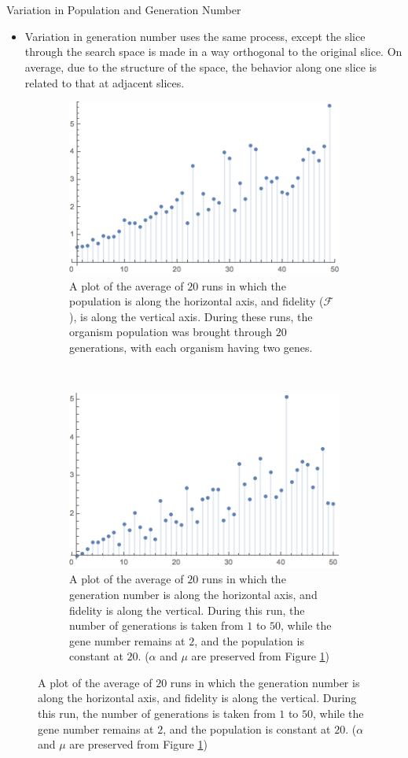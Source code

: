 \documentclass[12pt]{beamer}
\renewcommand{\maketitle}{%
	\begin{center}%
		\Huge\inserttitle\\[5mm]%
		\Large\insertauthor\\[5mm]%
		\Large\insertinstitute%
	\end{center}%
	\vspace*{-1.5ex}%
}
\begin{document}
\begin{frame}{\maketitle}
\begin{columns}
\begin{column}{.45\textwidth}
\begin{exampleblock}{Variation in Population and Generation Number}
\begin{itemize}
	\item Variation in generation number uses the same process, except the slice through the search space is made in a way orthogonal to the original slice. On average, due to the structure of the space, the behavior along one slice is related to that at adjacent slices. 
	\end{itemize}
	\vspace{-1.35em}
\begin{figure}[t!]
    \centering
    \begin{subfigure}[t]{0.5\textwidth}
        \centering
        \includegraphics[scale=1.2]{20G_Plot_2.png}
        \caption{A plot of the average of $20$ runs in which the population is along the horizontal axis, and fidelity ($\mathcal{F}$), is along the vertical axis. During these runs, the organism population was brought through $20$ generations, with each organism having two genes.}
        \label{fig:pop_plot}
    \end{subfigure}%
    ~
    \begin{subfigure}[t]{0.5\textwidth}
        \centering
        \includegraphics[scale=1.2]{20O_Plot_2.png}
        \caption{A plot of the average of $20$ runs in which the generation number is along the horizontal axis, and fidelity is along the vertical. During this run, the number of generations is taken from $1$ to $50$, while the gene number remains at $2$, and the population is constant at $20$. ($\alpha$ and $\mu$ are preserved from Figure \ref{fig:pop_plot})}
        \label{fig:gen_plot}
    \end{subfigure}


\end{figure}
\end{exampleblock}
\end{column}
\end{columns}
\end{frame}
\end{document}
